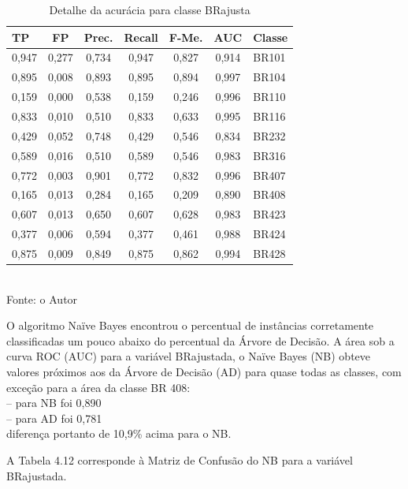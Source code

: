 	\begin{table}[!ht]
		\centering
		\caption{Detalhe da acurácia para classe BRajusta}
		\vspace{1mm}
		\begin{tabular}{l|c|c|c|c|c|l}
			\hline
			\textbf{TP} & \textbf{FP} & \textbf{Prec.} & \textbf{Recall} & \textbf{F-Me.} & \textbf{AUC} & \textbf{Classe} \\
			\hline
		0,947 &  0,277  & 0,734  &   0,947  & 0,827  & 0,914 & BR101\\
		0,895 &  0,008  & 0,893  &   0,895  & 0,894  & 0,997 & BR104\\
		0,159 &  0,000  & 0,538  &   0,159  & 0,246  & 0,996 & BR110\\
		0,833 &  0,010  & 0,510  &   0,833  & 0,633  & 0,995 & BR116\\
		0,429 &  0,052  & 0,748  &   0,429  & 0,546  & 0,834 & BR232\\
		0,589 &  0,016  & 0,510  &   0,589  & 0,546  & 0,983 & BR316\\
		0,772 &  0,003  & 0,901  &   0,772  & 0,832  & 0,996 & BR407\\
		0,165 &  0,013  & 0,284  &   0,165  & 0,209  & 0,890 & BR408\\
		0,607 &  0,013  & 0,650  &   0,607  & 0,628  & 0,983 & BR423\\
		0,377 &  0,006  & 0,594  &   0,377  & 0,461  & 0,988 & BR424\\
		0,875 &  0,009  & 0,849  &   0,875  & 0,862  & 0,994 & BR428\\
		
		\end{tabular}
		\\
		\tiny Fonte: o Autor
	\end{table}

O algoritmo Naïve Bayes encontrou o percentual de instâncias corretamente classificadas um pouco abaixo do percentual da   
Árvore de Decisão.
A área sob a curva ROC (AUC) para a variável BRajustada, o Naïve Bayes (NB) obteve valores próximos aos da Árvore de Decisão (AD) para quase todas as classes, com exceção para a área da classe BR 408:\\
-- para NB foi 0,890 \\ 
-- para AD foi 0,781 \\
diferença portanto de 10,9\% acima para o NB.

\pagebreak

A Tabela 4.12 corresponde à Matriz de Confusão do NB para a variável BRajustada.

